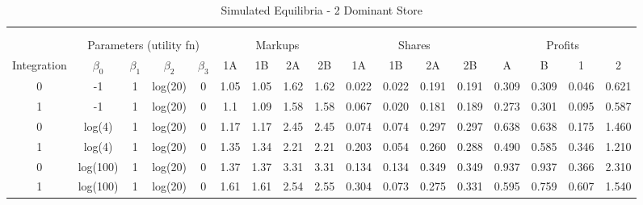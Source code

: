 \documentclass[12pt]{article}%
\begin{document}
\begin{table}[h]
{\begin{tabular}{c|cccc|cccc|cccc|cccc}
    \multicolumn{1}{c}{} &       &       &       & \multicolumn{1}{c}{} &       &       &       & \multicolumn{1}{c}{} &       &       &       & \multicolumn{1}{c}{} &       &       &       &  \\
    \multicolumn{1}{c}{} &       &       &       & \multicolumn{1}{c}{} &       &       &       & \multicolumn{1}{c}{} &       &       &       & \multicolumn{1}{c}{} &       &       &       &  \\
          & \multicolumn{4}{c|}{Parameters (utility fn)} & \multicolumn{4}{c|}{Markups}  & \multicolumn{4}{c|}{Shares}   & \multicolumn{4}{c}{Profits} \\
    \midrule
    \multicolumn{1}{c|}{Integration} & \multicolumn{1}{c}{$\beta_0$} & \multicolumn{1}{c}{$\beta_1$} & \multicolumn{1}{c}{$\beta_2$} & \multicolumn{1}{c|}{$\beta_3$} & \multicolumn{1}{c}{1A} & \multicolumn{1}{c}{1B} & \multicolumn{1}{c}{2A} & \multicolumn{1}{c|}{2B} & \multicolumn{1}{c}{1A} & \multicolumn{1}{c}{1B} & \multicolumn{1}{c}{2A} & \multicolumn{1}{c|}{2B} & \multicolumn{1}{c}{A} & \multicolumn{1}{c}{B} & \multicolumn{1}{c}{1} & \multicolumn{1}{c}{2} \\
    \midrule
    \midrule
 
    0     & -1    & 1     & log(20) & 0     & 1.05  & 1.05  & 1.62  & 1.62  & 0.022 & 0.022 & 0.191 & 0.191 & 0.309 & 0.309 & 0.046 & 0.621 \\
    1     & -1    & 1     & log(20) & 0     & 1.1   & 1.09  & 1.58  & 1.58  & 0.067 & 0.020 & 0.181 & 0.189 & 0.273 & 0.301 & 0.095 & 0.587 \\
    0     & log(4) & 1     & log(20) & 0     & 1.17  & 1.17  & 2.45  & 2.45  & 0.074 & 0.074 & 0.297 & 0.297 & 0.638 & 0.638 & 0.175 & 1.460 \\
    1     & log(4) & 1     & log(20) & 0     & 1.35  & 1.34  & 2.21  & 2.21  & 0.203 & 0.054 & 0.260 & 0.288 & 0.490 & 0.585 & 0.346 & 1.210 \\
    0     & log(100) & 1     & log(20) & 0     & 1.37  & 1.37  & 3.31  & 3.31  & 0.134 & 0.134 & 0.349 & 0.349 & 0.937 & 0.937 & 0.366 & 2.310 \\
    1     & log(100) & 1     & log(20) & 0     & 1.61  & 1.61  & 2.54  & 2.55  & 0.304 & 0.073 & 0.275 & 0.331 & 0.595 & 0.759 & 0.607 & 1.540 \\


    \end{tabular}%

    }
    
    \caption{Simulated Equilibria - 2 Dominant Store}
    
  \label{tab:store effects - 2 dom}%
\end{table}%
\end{document}

